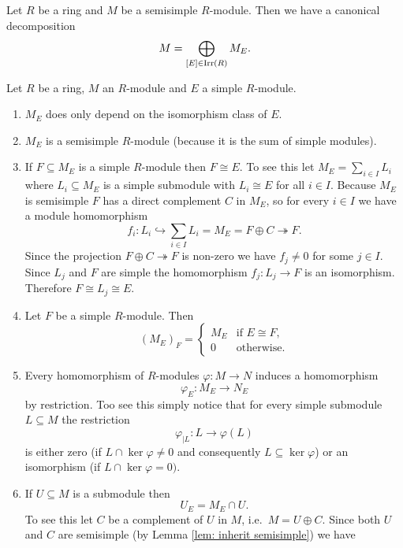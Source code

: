 \begin{cor}\label{cor: canonical decomposition semisimple module}
 Let $R$ be a ring and $M$ be a semisimple $R$-module. Then we have a canonical decomposition
 \[
  M = \bigoplus_{[E] \in \operatorname{Irr}(R)} M_E.
 \]
\end{cor}


\begin{rem}
  Let $R$ be a ring, $M$ an $R$-module and $E$ a simple $R$-module.
 \begin{enumerate}[label=\emph{\alph*)},leftmargin=*]
  \item
   $M_E$ does only depend on the isomorphism class of $E$.
  \item
   $M_E$ is a semisimple $R$-module (because it is the sum of simple modules).
  \item
   If $F \subseteq M_E$ is a simple $R$-module then $F \cong E$. To see this let $M_E = \sum_{i \in I} L_i$ where $L_i \subseteq M_E$ is a simple submodule with $L_i \cong E$ for all $i \in I$. Because $M_E$ is semisimple $F$ has a direct complement $C$ in $M_E$, so for every $i \in I$ we have a module homomorphism
   \[
    f_i \colon L_i \hookrightarrow \sum_{i \in I} L_i = M_E = F \oplus C \twoheadrightarrow F.
   \]
   Since the projection $F \oplus C \twoheadrightarrow F$ is non-zero we have $f_j \neq 0$ for some $j \in I$. Since $L_j$ and $F$ are simple the homomorphism $f_j \colon L_j \to F$ is an isomorphism. Therefore $F \cong L_j \cong E$.
  \item
   Let $F$ be a simple $R$-module. Then
   \[
    (M_E)_F =
    \begin{cases}
     M_E & \text{if } E \cong F, \\
       0 & \text{otherwise}.
    \end{cases}
   \]
  \item
   Every homomorphism of $R$-modules $\varphi \colon M \to N$ induces a homomorphism
   \[
    \varphi_E \colon M_E \to N_E
   \]
   by restriction. Too see this simply notice that for every simple submodule $L \subseteq M$ the restriction
   \[
    \varphi_{|L} \colon L \to \varphi(L)
   \]
   is either zero (if $L \cap \ker \varphi \neq 0$ and consequently $L \subseteq \ker \varphi$) or an isomorphism (if $L \cap \ker \varphi = 0)$.
  \item
   If $U \subseteq M$ is a submodule then
   \[
    U_E = M_E \cap U.
   \]
   To see this let $C$ be a complement of $U$ in $M$, i.e.\ $M = U \oplus C$. Since both $U$ and $C$ are semisimple (by Lemma \ref{lem: inherit semisimple}) we have

\end{enumerate}
\end{rem}
